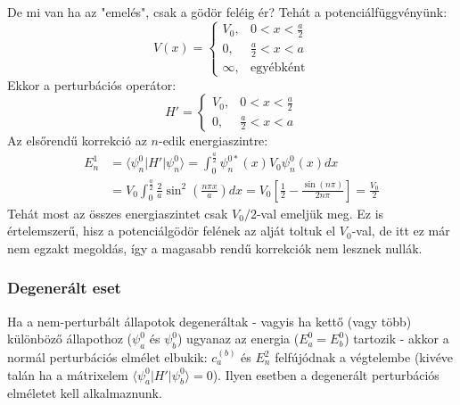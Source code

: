 \documentclass[../main.tex]{subfiles}
\begin{document}
De mi van ha az "emelés", csak a gödör feléig ér? Tehát a potenciálfüggvényünk:
\begin{equation}
    V(x) = \begin{cases}
        V_0, & 0 < x < \frac{a}{2} \\
        0, & \frac{a}{2} < x < a \\
        \infty, & \text{egyébként}
    \end{cases}
\end{equation}
Ekkor a perturbációs operátor:
\begin{equation}
    H' = \begin{cases}
        V_0, & 0 < x < \frac{a}{2} \\
        0, & \frac{a}{2} < x < a
    \end{cases}
\end{equation}
Az elsőrendű korrekció az $n$-edik energiaszintre:
\begin{equation}
    \begin{aligned}
        E_n^1 &= \langle \psi_n^0 | H' | \psi_n^0 \rangle = \int_0^{\frac{a}{2}} \psi_n^{0*} (x) V_0 \psi_n^0 (x) dx \\
        &= V_0 \int_0^{\frac{a}{2}} \frac{2}{a} \sin^2 \left(\frac{n \pi x}{a} \right) dx = V_0 \left[ \frac{1}{2} - \frac{\sin (n \pi)}{2 n \pi} \right] = \frac{V_0}{2}
    \end{aligned}
\end{equation}
Tehát most az összes energiaszintet csak $V_0/2$-val emeljük meg. Ez is értelemszerű, hisz a potenciálgödör felének az alját toltuk el $V_0$-val, de itt ez már nem egzakt megoldás, így a magasabb rendű korrekciók nem lesznek nullák.

\subsubsection*{Degenerált eset}
Ha a nem-perturbált állapotok degeneráltak - vagyis ha kettő (vagy több) különböző állapothoz ($\psi_a^0$ és $\psi_b^0$) ugyanaz az energia ($E_a^0 = E_b^0$) tartozik - akkor a normál perturbációs elmélet elbukik:
$c_a^{(b)}$ és $E_n^2$ felfújódnak a végtelembe (kivéve talán ha a mátrixelem $\langle \psi_a^0 | H' | \psi_b^0 \rangle = 0$). Ilyen esetben a degenerált perturbációs elméletet kell alkalmaznunk.
\end{document}
